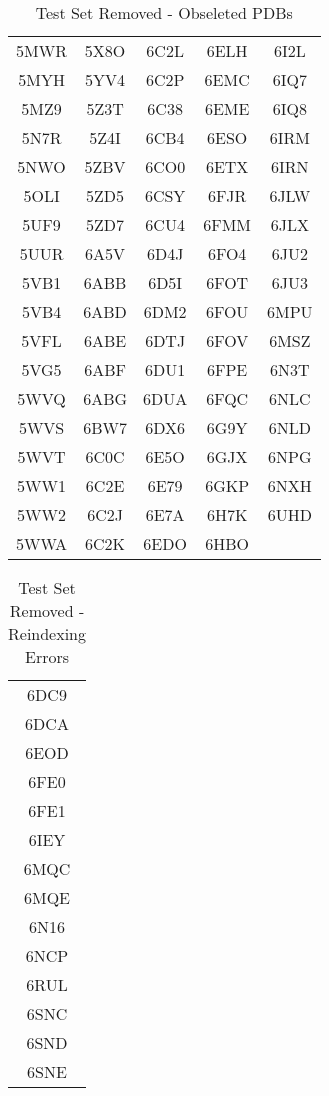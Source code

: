 \documentclass[journal=jcisd8,manuscript=article]{achemso}
\begin{document}
\begin{center}
  \begin{table}[ht]
    \centering
    \begin{tabular}{|c c c c c|}
      \hline
      5MWR & 5X8O & 6C2L & 6ELH & 6I2L \\
      5MYH & 5YV4 & 6C2P & 6EMC & 6IQ7 \\
      5MZ9 & 5Z3T & 6C38 & 6EME & 6IQ8 \\
      5N7R & 5Z4I & 6CB4 & 6ESO & 6IRM \\
      5NWO & 5ZBV & 6CO0 & 6ETX & 6IRN \\
      5OLI & 5ZD5 & 6CSY & 6FJR & 6JLW \\
      5UF9 & 5ZD7 & 6CU4 & 6FMM & 6JLX \\
      5UUR & 6A5V & 6D4J & 6FO4 & 6JU2 \\
      5VB1 & 6ABB & 6D5I & 6FOT & 6JU3 \\
      5VB4 & 6ABD & 6DM2 & 6FOU & 6MPU \\
      5VFL & 6ABE & 6DTJ & 6FOV & 6MSZ \\
      5VG5 & 6ABF & 6DU1 & 6FPE & 6N3T \\
      5WVQ & 6ABG & 6DUA & 6FQC & 6NLC \\
      5WVS & 6BW7 & 6DX6 & 6G9Y & 6NLD \\
      5WVT & 6C0C & 6E5O & 6GJX & 6NPG \\
      5WW1 & 6C2E & 6E79 & 6GKP & 6NXH \\
      5WW2 & 6C2J & 6E7A & 6H7K & 6UHD \\
      5WWA & 6C2K & 6EDO & 6HBO &      \\
      \hline
    \end{tabular}
    \caption{Test Set Removed - Obseleted PDBs}
    \label{table:testobseleted}
  \end{table}
\end{center}
\clearpage

\begin{center}
  \begin{table}[ht]
    \centering
    \begin{tabular}{|c|}
      \hline
      6DC9 \\
      6DCA \\
      6EOD \\
      6FE0 \\
      6FE1 \\
      6IEY \\
      6MQC \\
      6MQE \\
      6N16 \\
      6NCP \\
      6RUL \\
      6SNC \\
      6SND \\
      6SNE \\
      \hline
    \end{tabular}
    \caption{Test Set Removed - Reindexing Errors}
    \label{table:testreindex}
  \end{table}
\end{center}
\clearpage
\end{document}
